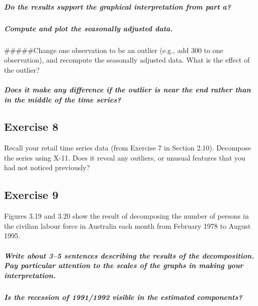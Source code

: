 \documentclass[
  11pt,
]{article}
\let\oldsubparagraph\subparagraph
\renewcommand{\subparagraph}[1]{\oldsubparagraph{#1}\mbox{}}
\begin{document}
\subparagraph{Do the results support the graphical interpretation from
part
a?}\label{do-the-results-support-the-graphical-interpretation-from-part-a}

\subparagraph{Compute and plot the seasonally adjusted
data.}\label{compute-and-plot-the-seasonally-adjusted-data.}

\#\#\#\#\#Change one observation to be an outlier (e.g., add 300 to one
observation), and recompute the seasonally adjusted data. What is the
effect of the outlier?

\subparagraph{Does it make any difference if the outlier is near the end
rather than in the middle of the time
series?}\label{does-it-make-any-difference-if-the-outlier-is-near-the-end-rather-than-in-the-middle-of-the-time-series}

\subsection{Exercise 8}\label{exercise-8}

Recall your retail time series data (from Exercise 7 in Section 2.10).
Decompose the series using X-11. Does it reveal any outliers, or unusual
features that you had not noticed previously?

\subsection{Exercise 9}\label{exercise-9}

Figures 3.19 and 3.20 show the result of decomposing the number of
persons in the civilian labour force in Australia each month from
February 1978 to August 1995.

\subparagraph{Write about 3--5 sentences describing the results of the
decomposition. Pay particular attention to the scales of the graphs in
making your
interpretation.}\label{write-about-35-sentences-describing-the-results-of-the-decomposition.-pay-particular-attention-to-the-scales-of-the-graphs-in-making-your-interpretation.}

\subparagraph{Is the recession of 1991/1992 visible in the estimated
components?}\label{is-the-recession-of-19911992-visible-in-the-estimated-components}
\end{document}
